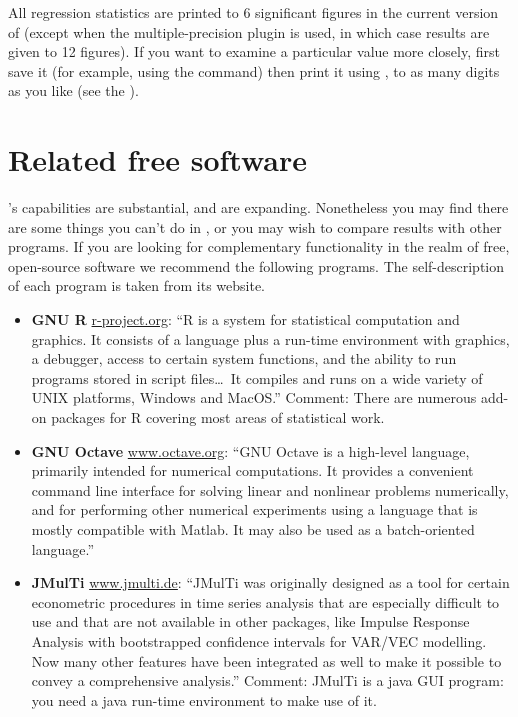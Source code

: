 All regression statistics are printed to 6 significant figures in the
current version of  (except when the multiple-precision
plugin is used, in which case results are given to 12 figures).  If
you want to examine a particular value more closely, first save it
(for example, using the  command) then print it using
, to as many digits as you like (see the \GCR).  

\chapter{Related free software}
\label{app-advanced}

's capabilities are substantial, and are expanding.
Nonetheless you may find there are some things you can't do in
, or you may wish to compare results with other programs.
If you are looking for complementary functionality in the realm of
free, open-source software we recommend the following programs.  The
self-description of each program is taken from its website.

\begin{itemize}

\item \textbf{GNU R} \href{http://www.r-project.org/}{r-project.org}:
  ``R is a system for statistical computation and graphics. It
  consists of a language plus a run-time environment with graphics, a
  debugger, access to certain system functions, and the ability to run
  programs stored in script files\dots\ It compiles and runs on a wide
  variety of UNIX platforms, Windows and MacOS.''  Comment: There are
  numerous add-on packages for R covering most areas of statistical
  work.

\item \textbf{GNU Octave}
  \href{http://www.octave.org/}{www.octave.org}:
  ``GNU Octave is a high-level language, primarily intended for
  numerical computations. It provides a convenient command line
  interface for solving linear and nonlinear problems numerically, and
  for performing other numerical experiments using a language that is
  mostly compatible with Matlab. It may also be used as a
  batch-oriented language.''

\item \textbf{JMulTi} \href{http://www.jmulti.de/}{www.jmulti.de}:
  ``JMulTi was originally designed as a tool for certain econometric
  procedures in time series analysis that are especially difficult to
  use and that are not available in other packages, like Impulse
  Response Analysis with bootstrapped confidence intervals for VAR/VEC
  modelling. Now many other features have been integrated as well to
  make it possible to convey a comprehensive analysis.''  Comment:
  JMulTi is a java GUI program: you need a java run-time environment to
  make use of it.

\end{itemize}


